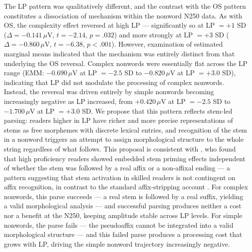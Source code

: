 \documentclass[utf8]{FrontiersinHarvard} %
\begin{document}
	The LP pattern was qualitatively different, and the contrast with the OS pattern constitutes a dissociation of mechanism within the nonword N250 data. As with OS, the complexity effect reversed at high LP --- significantly so at LP $= +1$ SD ($\Delta = -0.141\,\mu$V, $t = -2.14$, $p = .032$) and more strongly at LP $= +3$ SD ($\Delta = -0.860\,\mu$V, $t = -6.38$, $p < .001$). However, examination of estimated marginal means indicated that the mechanism was entirely distinct from that underlying the OS reversal. Complex nonwords were essentially flat across the LP range (EMM: $-0.690\,\mu$V at LP $= -2.5$ SD to $-0.820\,\mu$V at LP $= +3.0$ SD), indicating that LP did not modulate the processing of complex nonwords. Instead, the reversal was driven entirely by simple nonwords becoming increasingly negative as LP increased, from $+0.420\,\mu$V at LP $= -2.5$ SD to $-1.700\,\mu$V at LP $= +3.0$ SD. We propose that this pattern reflects stem-led parsing: readers higher in LP have richer and more precise representations of stems as free morphemes with discrete lexical entries, and recognition of the stem in a nonword triggers an attempt to assign morphological structure to the whole string regardless of what follows. This proposal is consistent with \citet{beyersmann2016}, who found that high proficiency readers showed embedded stem priming effects independent of whether the stem was followed by a real affix or a non-affixal ending --- a pattern suggesting that stem activation in skilled readers is not contingent on affix recognition, in contrast to the standard affix-stripping account \citep{taft_lexical_1975, rastleMorphologicalDecompositionBased2008}. For complex nonwords, this parse succeeds --- a real stem is followed by a real suffix, yielding a valid morphological analysis --- and successful parsing produces neither a cost nor a benefit at the N250, keeping amplitude stable across LP levels. For simple nonwords, the parse fails --- the pseudoaffix cannot be integrated into a valid morphological structure --- and this failed parse produces a processing cost that grows with LP, driving the simple nonword trajectory increasingly negative.
	
\end{document}
